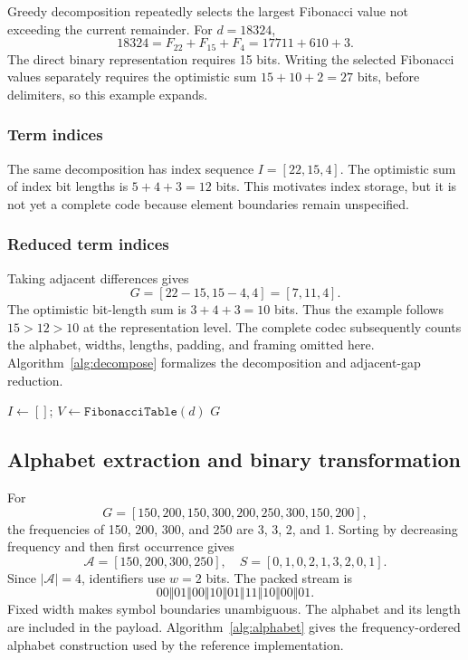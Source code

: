 \documentclass[a4paper,fleqn]{cas-dc}
\begin{document}
Greedy decomposition repeatedly selects the largest Fibonacci value not
exceeding the current remainder. For $d=18324$,
\begin{equation}
18324=F_{22}+F_{15}+F_4=17711+610+3.
\end{equation}
The direct binary representation requires 15 bits. Writing the selected
Fibonacci values separately requires the optimistic sum $15+10+2=27$ bits,
before delimiters, so this example expands.

\subsubsection{Term indices}

The same decomposition has index sequence $I=[22,15,4]$. The optimistic sum
of index bit lengths is $5+4+3=12$ bits. This motivates index storage, but it
is not yet a complete code because element boundaries remain unspecified.

\subsubsection{Reduced term indices}

Taking adjacent differences gives
\begin{equation}
G=[22-15,15-4,4]=[7,11,4].
\end{equation}
The optimistic bit-length sum is $3+4+3=10$ bits. Thus the example follows
$15>12>10$ at the representation level. The complete codec subsequently
counts the alphabet, widths, lengths, padding, and framing omitted here.
Algorithm~\ref{alg:decompose} formalizes the decomposition and adjacent-gap
reduction.

\begin{algorithm}[t]
\caption{\texttt{DecomposeAndReduce($d$)}}
\label{alg:decompose}
$I\leftarrow[]$; $V\leftarrow\texttt{FibonacciTable}(d)$\;
\Return $G$\;
\end{algorithm}

\subsection{Alphabet extraction and binary transformation}

For
\[
G=[150,200,150,300,200,250,300,150,200],
\]
the frequencies of 150, 200, 300, and 250 are 3, 3, 2, and 1. Sorting by
decreasing frequency and then first occurrence gives
\[
\mathcal{A}=[150,200,300,250],\quad
S=[0,1,0,2,1,3,2,0,1].
\]
Since $|\mathcal{A}|=4$, identifiers use $w=2$ bits. The packed stream is
\[
00\Vert01\Vert00\Vert10\Vert01\Vert11\Vert10\Vert00\Vert01.
\]
Fixed width makes symbol boundaries unambiguous. The alphabet and its length
are included in the payload. Algorithm~\ref{alg:alphabet} gives the
frequency-ordered alphabet construction used by the reference implementation.
\end{document}
